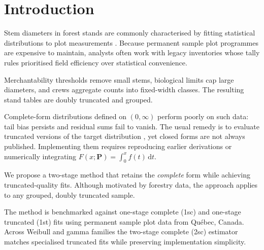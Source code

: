 \section{Introduction}
\label{sec:introduction}

Stem diameters in forest stands are commonly characterised by fitting statistical distributions to plot measurements \citep{bailey1973quantifying, hyink1983generalized}. Because permanent sample plot programmes are expensive to maintain, analysts often work with legacy inventories whose tally rules prioritised field efficiency over statistical convenience.

Merchantability thresholds remove small stems, biological limits cap large diameters, and crews aggregate counts into fixed-width classes. The resulting stand tables are doubly truncated and grouped.

Complete-form distributions defined on $(0, \infty)$ perform poorly on such data: tail bias persists and residual sums fail to vanish. The usual remedy is to evaluate truncated versions of the target distribution \citep{zutter1986characterizing}, yet closed forms are not always published. Implementing them requires reproducing earlier derivations \citep{mittal1989estimating, hannon1999estimation, hegde1989estimation, ahmad2001moments, wingo1989left} or numerically integrating $F(x; \boldsymbol{P}) = \int_0^x f(t)\,\mathrm{d}t$.

We propose a two-stage method that retains the \emph{complete} form while achieving truncated-quality fits. Although motivated by forestry data, the approach applies to any grouped, doubly truncated sample.

The method is benchmarked against one-stage complete (1sc) and one-stage truncated (1st) fits using permanent sample plot data from Qu\'ebec, Canada. Across Weibull and gamma families the two-stage complete (2sc) estimator matches specialised truncated fits while preserving implementation simplicity.

